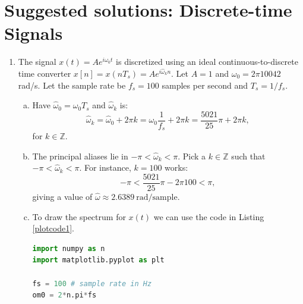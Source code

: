 \newpage
\section{Suggested solutions: Discrete-time Signals}
\begin{enumerate}
\item The signal $x(t)=Ae^{i\omega_{0}t}$ is discretized using an ideal continuous-to-discrete time converter $x[n]=x(nT_{s})=Ae^{i\hat{\omega}_{k}n}$. 
Let $A=1$ and $\omega_{0}=2\pi 10042$ rad/s. Let the sample rate be $f_{s}=100$ samples per second and $T_{s}=1/f_{s}$.

\begin{enumerate}[a)]
\item Have $\hat{\omega}_{0}=\omega_{0}T_{s}$ and $\hat{\omega}_{k}$ is:
$$\hat{\omega}_{k}=\hat{\omega}_{0}+2\pi k=\omega_{0}\frac{1}{f_{s}}+2\pi k=\frac{5021}{25}\pi+2\pi k,$$
for $k\in\mathbb{Z}$. 

\item The principal aliases lie in $-\pi<\hat{\omega}_{k}<\pi$. Pick a $k\in\mathbb{Z}$ such that $-\pi<\hat{\omega}_{k}<\pi$. 
For instance, $k=100$ works:
$$-\pi < \frac{5021}{25}\pi-2\pi 100 < \pi,$$
giving a value of $\hat{\omega}\approx2.6389\ \text{rad/sample}$. 

\item To draw the spectrum for $x(t)$ we can use the code in Listing \ref{plotcode1}.

\begin{lstlisting}[language=Python, caption=Spectrum of $x(t)$,label=plotcode1]
import numpy as n
import matplotlib.pyplot as plt

fs = 100 # sample rate in Hz
om0 = 2*n.pi*fs


\end{lstlisting}
\end{enumerate}
\end{enumerate}
